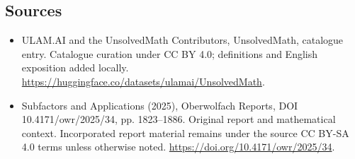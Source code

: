 \documentclass[11pt]{article}
\begin{document}
\subsection{Sources}
\begin{itemize}
\item[\hypertarget{source:statement:1}{S1}] ULAM.AI and the UnsolvedMath Contributors, UnsolvedMath, catalogue entry. Catalogue curation under CC BY 4.0; definitions and English exposition added locally.
\url{https://huggingface.co/datasets/ulamai/UnsolvedMath}.
\item[\hypertarget{source:statement:2}{S2}] Subfactors and Applications (2025), Oberwolfach Reports, DOI 10.4171/owr/2025/34, pp. 1823--1886. Original report and mathematical context. Incorporated report material remains under the source CC BY-SA 4.0 terms unless otherwise noted.
\url{https://doi.org/10.4171/owr/2025/34}.
\end{itemize}
\label{end:statement}
\end{document}

